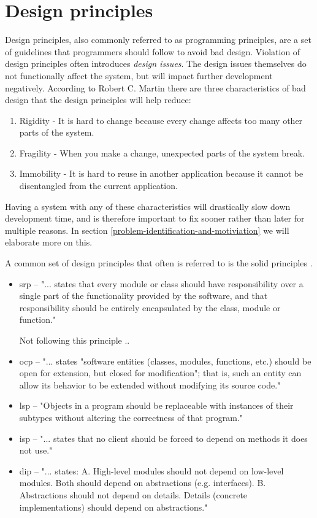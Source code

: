 \documentclass[pdftex,10pt,b5paper,twoside]{report}
\begin{document}
\section{Design principles}
\label{design-principles}
Design principles, also commonly referred to as programming principles, are a set of guidelines that programmers should follow to avoid bad design. Violation of design principles often introduces \textit{design issues}. The design issues themselves do not functionally affect the system, but will impact further development negatively. According to Robert C. Martin \cite{robertcmartinprinciples} there are three characteristics of bad design that the design principles will help reduce:

\begin{enumerate}
	\item Rigidity - It is hard to change because every change affects too many other parts of the system.
	\item Fragility - When you make a change, unexpected parts of the system break.
	\item Immobility - It is hard to reuse in another application because it cannot be disentangled from the current application.
\end{enumerate}

Having a system with any of these characteristics will drastically slow down development time, and is therefore important to fix sooner rather than later for multiple reasons. In section \ref{problem-identification-and-motiviation} we will elaborate more on this.

A common set of design principles that often is referred to is the \gls{solid} principles \cite{solid}.

\begin{itemize}
    \item \gls{srp} -- "... states that every module or class should have responsibility over a single part of the functionality provided by the software, and that responsibility should be entirely encapsulated by the class, module or function." \cite{srp}
    
    Not following this principle .. 
    \item \gls{ocp} -- "... states "software entities (classes, modules, functions, etc.) should be open for extension, but closed for modification"; that is, such an entity can allow its behavior to be extended without modifying its source code." \cite{ocp}
    \item \gls{lsp} -- "Objects in a program should be replaceable with instances of their subtypes without altering the correctness of that program." \cite{lsp}
    \item \gls{isp} -- "... states that no client should be forced to depend on methods it does not use." \cite{isp}
    \item \gls{dip} --  "... states: \newline A. High-level modules should not depend on low-level modules. Both should depend on abstractions (e.g. interfaces). \newline
B. Abstractions should not depend on details. Details (concrete implementations) should depend on abstractions." \cite{dip}
\end{itemize}
    
\end{document}
